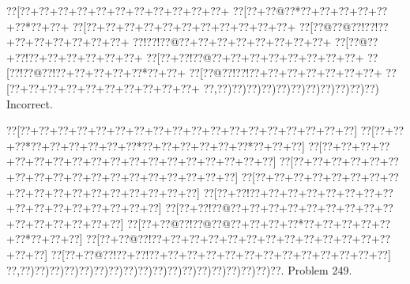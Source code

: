 \documentclass[a5paper]{article}
\begin{document}
\begin{center}
{\goo
\0??[\0??+\0??+\0??+\0??+\0??+\0??+\0??+\0??+\0??+\0??+\0??+
\0??[\0??+\0??@\0??*\0??+\0??+\0??+\0??+\0??+\0??*\0??+\0??+
\0??[\0??+\0??+\0??+\0??+\0??+\0??+\0??+\0??+\0??+\0??+\0??+
\0??[\0??@\0??@\0??!\0??!\0??+\0??+\0??+\0??+\0??+\0??+\0??+
\0??!\0??!\0??@\0??+\0??+\0??+\0??+\0??+\0??+\0??+\0??+
\0??[\0??@\0??+\0??!\0??+\0??+\0??+\0??+\0??+\0??+
\0??[\0??+\0??!\0??@\0??+\0??+\0??+\0??+\0??+\0??+\0??+\0??+
\0??[\0??!\0??@\0??!\0??+\0??+\0??+\0??+\0??*\0??+\0??+
\0??[\0??@\0??!\0??!\0??+\0??+\0??+\0??+\0??+\0??+\0??+
\0??[\0??+\0??+\0??+\0??+\0??+\0??+\0??+\0??+\0??+\0??+
\0??,\0??)\0??)\0??)\0??)\0??)\0??)\0??)\0??)\0??)\0??)\0??)
}
Incorrect. 

\end{center}
\newpage
\begin{center}
{\goo
\0??[\0??+\0??+\0??+\0??+\0??+\0??+\0??+\0??+\0??+\0??+\0??+\0??+\0??+\0??+\0??+\0??+\0??+\0??]
\0??[\0??+\0??+\0??*\0??+\0??+\0??+\0??+\0??+\0??*\0??+\0??+\0??+\0??+\0??+\0??*\0??+\0??+\0??]
\0??[\0??+\0??+\0??+\0??+\0??+\0??+\0??+\0??+\0??+\0??+\0??+\0??+\0??+\0??+\0??+\0??+\0??+\0??]
\0??[\0??+\0??+\0??+\0??+\0??+\0??+\0??+\0??+\0??+\0??+\0??+\0??+\0??+\0??+\0??+\0??+\0??+\0??]
\0??[\0??+\0??+\0??+\0??+\0??+\0??+\0??+\0??+\0??+\0??+\0??+\0??+\0??+\0??+\0??+\0??+\0??+\0??]
\0??[\0??+\0??!\0??+\0??+\0??+\0??+\0??+\0??+\0??+\0??+\0??+\0??+\0??+\0??+\0??+\0??+\0??+\0??]
\0??[\0??+\0??!\0??@\0??+\0??+\0??+\0??+\0??+\0??+\0??+\0??+\0??+\0??+\0??+\0??+\0??+\0??+\0??]
\0??[\0??+\0??@\0??!\0??@\0??@\0??+\0??+\0??+\0??*\0??+\0??+\0??+\0??+\0??+\0??*\0??+\0??+\0??]
\0??[\0??+\0??@\0??!\0??+\0??+\0??+\0??+\0??+\0??+\0??+\0??+\0??+\0??+\0??+\0??+\0??+\0??+\0??]
\0??[\0??+\0??@\0??!\0??+\0??!\0??+\0??+\0??+\0??+\0??+\0??+\0??+\0??+\0??+\0??+\0??+\0??+\0??]
\0??,\0??)\0??)\0??)\0??)\0??)\0??)\0??)\0??)\0??)\0??)\0??)\0??)\0??)\0??)\0??)\0??)\0??)\0??.
}
Problem 249.

\end{center}
\end{document}

